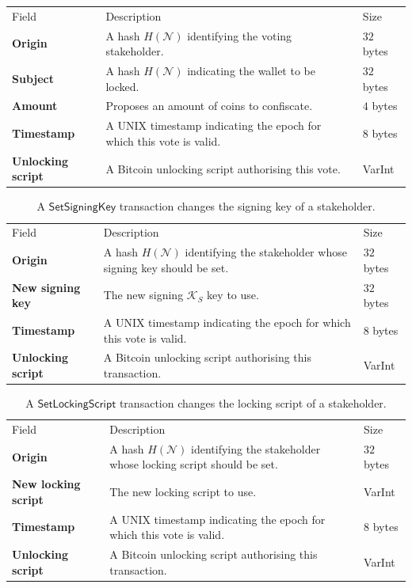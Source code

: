 \documentclass{style/kththesis}
\begin{document}
\begin{appendices}
\begin{table}[ht]
\label{tab:confiscate}
\begin{tabularx}{\textwidth}{lXl}
\cmidrule(r){1-3}
Field & Description & Size \\ 
\cmidrule(r){1-3}
\textbf{Origin} & A hash  $H(\mathcal{N})$ identifying the voting stakeholder. & $32$ bytes \\
\textbf{Subject} & A hash $H(\mathcal{N})$ indicating the wallet to be locked. & $32$ bytes \\
\textbf{Amount} & Proposes an amount of coins to confiscate. & $4$ bytes\\
\textbf{Timestamp} & A UNIX timestamp indicating the epoch for which this vote is valid. & $8$ bytes \\
\textbf{Unlocking script} & A Bitcoin unlocking script authorising this vote. & VarInt \\
\end{tabularx}
\end{table}
\begin{table}[ht]
\caption{A $\mathsf{SetSigningKey}$ transaction changes the signing key of a stakeholder.}
\label{tab:setkey}
\begin{tabularx}{\textwidth}{lXl}
\cmidrule(r){1-3}
Field & Description & Size \\ 
\cmidrule(r){1-3}
\textbf{Origin} & A hash $H(\mathcal{N})$ identifying the stakeholder whose signing key should be set. & $32$ bytes \\
\textbf{New signing key} & The new signing $\mathcal{K}_S$ key to use. & $32$ bytes \\
\textbf{Timestamp} & A UNIX timestamp indicating the epoch for which this vote is valid. & $8$ bytes \\
\textbf{Unlocking script} & A Bitcoin unlocking script authorising this transaction. & VarInt \\
\end{tabularx}
\end{table}
\begin{table}[ht]
\caption{A $\mathsf{SetLockingScript}$ transaction changes the locking script of a stakeholder.}
\label{tab:setlockscript}
\begin{tabularx}{\textwidth}{lXl}
\cmidrule(r){1-3}
Field & Description & Size \\ 
\cmidrule(r){1-3}
\textbf{Origin} & A hash $H(\mathcal{N})$ identifying the stakeholder whose locking script should be set. & $32$ bytes \\
\textbf{New locking script} & The new locking script to use. & VarInt \\
\textbf{Timestamp} & A UNIX timestamp indicating the epoch for which this vote is valid. & $8$ bytes \\
\textbf{Unlocking script} & A Bitcoin unlocking script authorising this transaction. & VarInt \\
\end{tabularx}
\end{table}


\end{appendices}
\end{document}
